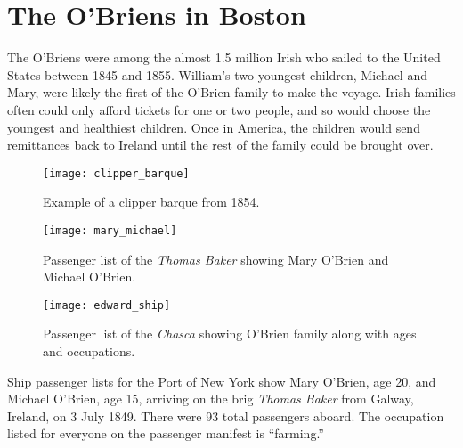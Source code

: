 \chapter{The O'Briens in Boston}

The O'Briens were among the almost 1.5 million Irish who sailed to the United States between 1845 and 1855.\cite{Miller:291} William's two youngest children, Michael and Mary, were likely the first of the O'Brien family to make the voyage. Irish families often could only afford tickets for one or two people, and so would choose the youngest and healthiest children.\cite{Miller:292} Once in America, the children would send remittances back to Ireland until the rest of the family could be brought over.\cite{Miller:295}

\begin{figure}[htbp]
	\centering
	\texttt{[image: clipper\_barque]}
	\caption{Example of a clipper barque from 1854.}
	\label{fig:Clipper}
\end{figure}

\begin{figure}
	\centering
	\texttt{[image: mary\_michael]}
	\caption{Passenger list of the \textit{Thomas Baker} showing Mary O'Brien and Michael O'Brien.}
	\label{fig:ThomasBaker}
\end{figure}

\begin{figure}
	\texttt{[image: edward\_ship]}
	\caption{Passenger list of the \textit{Chasca} showing O'Brien family along with ages and occupations.}
	\label{fig:Chasca}
\end{figure}

Ship passenger lists for the Port of New York show Mary O'Brien, age 20, and Michael O'Brien, age 15, arriving on the brig \textit{Thomas Baker} from Galway, Ireland, on 3 July 1849. There were 93 total passengers aboard. The occupation listed for everyone on the passenger manifest is ``farming.''\cite{ThomasBaker}

